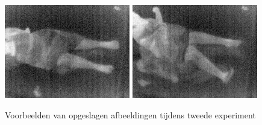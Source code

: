 \begin{figure}[hbp]
	\includegraphics[scale=0.85]{TweedeExperiment_img0}
	\includegraphics[scale=0.85]{TweedeExperiment_img4}
	\caption{Voorbeelden van opgeslagen afbeeldingen tijdens tweede experiment}
	\label{imgTEx1}
\end{figure}

